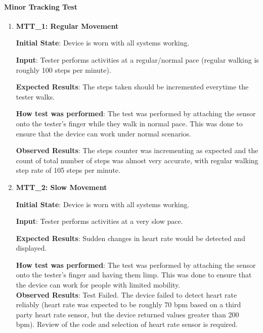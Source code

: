 \documentclass[12pt, titlepage]{article}
\begin{document}
\paragraph{Minor Tracking Test}
\begin{enumerate}
  \item{\textbf{MTT\_1: Regular Movement} \\}\label{MTT1}

  \textbf{Initial State}: Device is worn with all systems working.

  \textbf{Input}: Tester performs activities at a regular/normal pace (regular walking is roughly 100 steps per minute).

  \textbf{Expected Results}: The steps taken should be incremented everytime the tester walks.

  \textbf{How test was performed}: The test was performed by attaching the sensor onto the tester's finger while they walk in normal pace. This was done to ensure that the device can work under normal scenarios.

  \textbf{Observed Results}: The steps counter was incrementing as expected and the count of total number of steps was almost very accurate, with regular walking step rate of 105 steps per minute.

  \item{\textbf{MTT\_2: Slow Movement} \\}\label{MTT2}

  \textbf{Initial State}: Device is worn with all systems working.

  \textbf{Input}: Tester performs activities at a very slow pace.

  \textbf{Expected Results}: Sudden changes in heart rate would be detected and displayed.

  \textbf{How test was performed}: The test was performed by attaching the sensor onto the tester's finger and having them limp. This was done to ensure that the device can work for people with limited mobility.\\

  \textbf{Observed Results}: Test Failed. The device failed to detect heart rate reliably (heart rate was expected to be roughly 70 bpm based on a third party heart rate sensor, but the device returned values greater than 200 bpm). Review of the code and selection of heart rate sensor is required.

\end{enumerate}
\end{document}
